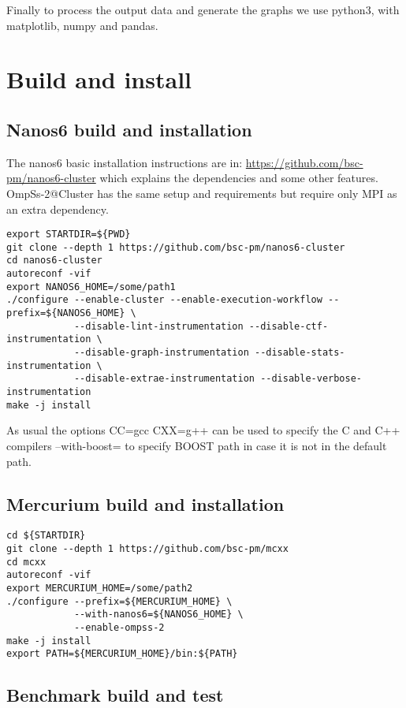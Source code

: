 \documentclass{article}
\begin{document}
Finally to process the output data and generate the graphs we use
python3, with matplotlib, numpy and pandas.

\section{Build and install}

\subsection{Nanos6 build and installation}

The nanos6 basic installation instructions are in:
\url{https://github.com/bsc-pm/nanos6-cluster} which explains the
dependencies and some other features.  OmpSs-2@Cluster has the same
setup and requirements but require only MPI as an extra dependency.

\begin{lstlisting}
export STARTDIR=${PWD}
git clone --depth 1 https://github.com/bsc-pm/nanos6-cluster
cd nanos6-cluster
autoreconf -vif
export NANOS6_HOME=/some/path1
./configure --enable-cluster --enable-execution-workflow --prefix=${NANOS6_HOME} \
            --disable-lint-instrumentation --disable-ctf-instrumentation \
            --disable-graph-instrumentation --disable-stats-instrumentation \
            --disable-extrae-instrumentation --disable-verbose-instrumentation
make -j install
\end{lstlisting}

As usual the options CC=gcc CXX=g++ can be used to specify the C and
C++ compilers --with-boost= to specify BOOST path in case it is not in
the default path.

\subsection{Mercurium build and installation}

\begin{lstlisting}
cd ${STARTDIR}
git clone --depth 1 https://github.com/bsc-pm/mcxx
cd mcxx
autoreconf -vif
export MERCURIUM_HOME=/some/path2
./configure --prefix=${MERCURIUM_HOME} \
            --with-nanos6=${NANOS6_HOME} \
            --enable-ompss-2
make -j install
export PATH=${MERCURIUM_HOME}/bin:${PATH}
\end{lstlisting}

\subsection{Benchmark build and test}
\end{document}
